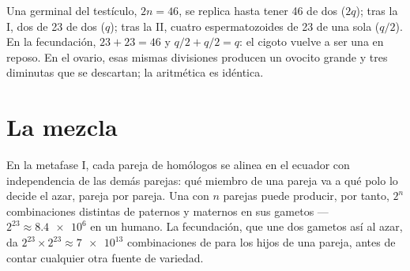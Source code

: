\begin{example}\label{ex:g12:meiosis-genetic-shuffling:numbers}
Una  germinal del testículo, $2n = 46$, se replica hasta tener 46
 de dos  ($2q$); tras la  I, dos  de
23  de dos  ($q$); tras la  II, cuatro
espermatozoides de 23  de una sola  ($q/2$). En la
fecundación, $23 + 23 =
46$ y $q/2 + q/2 = q$: el cigoto vuelve a ser
una   en reposo. En el ovario, esas mismas divisiones
producen un ovocito grande y tres  diminutas que se descartan;
la aritmética es idéntica.
\end{example}

\section{La mezcla}

\begin{proposition}\label{prop:g12:meiosis-genetic-shuffling:assortment}
En la metafase I, cada pareja de homólogos se alinea en el ecuador con
independencia de las demás parejas: qué miembro de una pareja va a qué
polo lo decide el azar, pareja por pareja. Una  con $n$ parejas
puede producir, por tanto, $2^n$ combinaciones distintas de 
paternos y maternos en sus gametos --- $2^{23} \approx \num{8.4e6}$ en
un humano. La fecundación, que une dos gametos así al azar, da $2^{23}
\times 2^{23} \approx \num{7e13}$ combinaciones de  para los
hijos de una pareja, antes de contar cualquier otra fuente de
variedad.
\end{proposition}
\admitted

